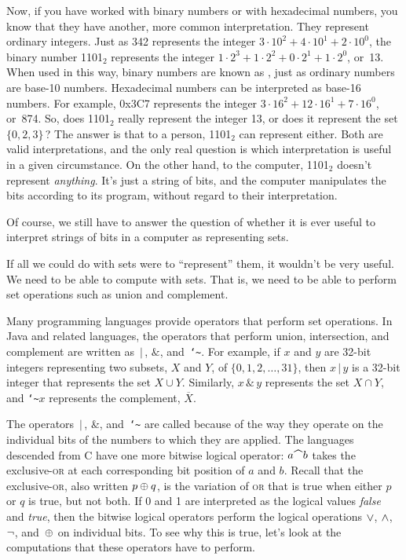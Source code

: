 Now, if you have worked with binary numbers or with hexadecimal
numbers, you know that they have another, more common interpretation.
They represent ordinary integers.  Just as 342 represents the
integer $3\cdot 10^2 + 4\cdot 10^1 +2\cdot 10^0$, the
binary number 1101$_2$ represents the integer
$1\cdot 2^3 +1\cdot 2^2 +0\cdot 2^1 +1\cdot 2^0$, or~13.
When used in this way, binary numbers are known as 
, just as ordinary numbers
are base-10 numbers.  Hexadecimal numbers can be interpreted
as base-16 numbers.  For example, 0x3C7 represents the
integer $3\cdot 16^2 + 12\cdot 16^1 + 7\cdot 16^0$, or~874.
So, does 1101$_2$ really represent the integer 13, or does it
represent the set $\{0,2,3\}\,$?  The answer is that to a person,
1101$_2$ can represent either.  Both are valid interpretations,
and the only real question is which interpretation is useful in
a given circumstance.  On the other hand, to the computer,
1101$_2$ doesn't represent \emph{anything}.  It's just a string
of bits, and the computer manipulates the bits according to its
program, without regard to their interpretation.

Of course, we still have to answer the question of whether it
is ever useful to interpret strings of bits in a computer as
representing sets.

\medbreak

If all we could do with sets were to ``represent'' them, it wouldn't
be very useful.  We need to be able to compute with sets.  That
is, we need to be able to perform set operations such as 
union and complement.

Many programming languages provide operators that perform set
operations.  In Java and related languages, the operators
that perform union, intersection, and complement are written
as $\,|\,$, $\&$, and~\texttt{\char`\~}.  For example, 
if $x$ and $y$ are 32-bit integers representing two subsets,
$X$ and $Y$, of $\{0,1,2,\dots,31\}$, then
$x\,|\,y$ is a 32-bit integer that represents the set $X\cup Y$.
Similarly, $x\,\&\,y$ represents the set $X\cap Y$, and
\texttt{\char`\~}$x$ represents the complement,
$\overline{X}$.


The operators $\,|\,$, \&, and~\texttt{\char`\~}
are called 
because of the way they operate on the individual bits of the numbers
to which they are applied.  The languages descended from C have one more bitwise logical
operator: $a\,\Caret\,b$ takes the exclusive-\textsc{or} at each
corresponding bit position of $a$ and $b$. Recall that the
exclusive-\textsc{or}, also written $p\oplus q$, is the variation
of \textsc{or} that is true when either $p$ or $q$ is true, but not both.
If 0 and 1 are interpreted as the
logical values \textit{false} and \textit{true}, then the
bitwise logical operators perform the logical operations
$\vee$, $\wedge$, $\lnot$, and~$\oplus$ on individual bits.  To see why this
is true, let's look at the computations that these operators
have to perform.

